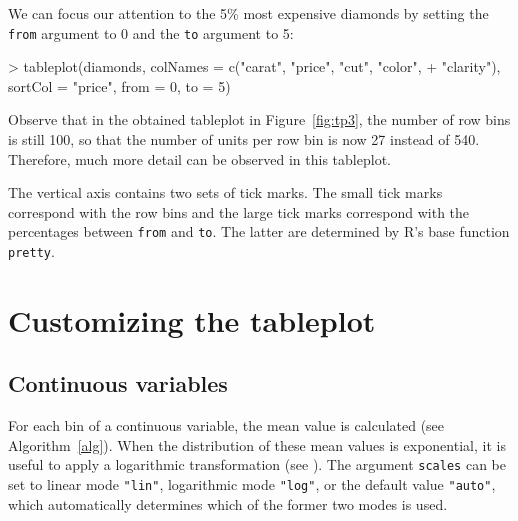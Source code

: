 \documentclass[11pt, fleqn, a4paper]{article}
\begin{document}
We can focus our attention to the 5\% most expensive diamonds by setting the {\tt from} argument to 0 and the {\tt to} argument to 5:

\begin{Schunk}
\begin{Sinput}
> tableplot(diamonds, colNames = c("carat", "price", "cut", "color", 
+     "clarity"), sortCol = "price", from = 0, to = 5)
\end{Sinput}
\end{Schunk}

Observe that in the obtained tableplot in Figure~\ref{fig:tp3}, the number of row bins is still 100, so that the number of units per row bin is now 27 instead of 540. Therefore, much more detail can be observed in this tableplot.

The vertical axis contains two sets of tick marks. The small tick marks correspond with the row bins and the large tick marks correspond with the percentages between {\tt from} and {\tt to}. The latter are determined by R's base function {\tt pretty}.


\section{Customizing the tableplot}


\subsection{Continuous variables}

For each bin of a continuous variable, the mean value is calculated (see Algorithm~\ref{alg}).
When the distribution of these mean values is exponential, it is useful to apply a logarithmic transformation (see \cite{ten11}). The argument {\tt scales} can be set to linear mode {\tt "lin"}, logarithmic mode {\tt "log"}, or the default value {\tt "auto"}, which automatically determines which of the former two modes is used.
\end{document}
